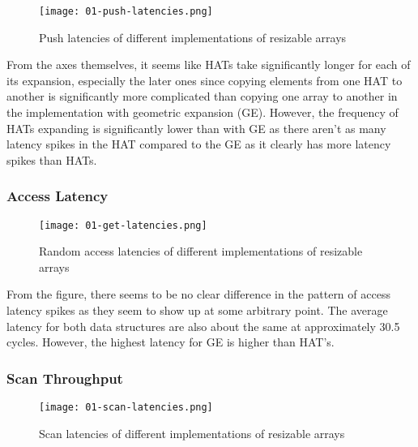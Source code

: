 \begin{figure}[H]
	\begin{center}
		\texttt{[image: 01-push-latencies.png]}
		\caption{Push latencies of different implementations of resizable arrays}
		\label{fig:push-latency}
	\end{center}
\end{figure}

From the axes themselves, it seems like HATs take significantly longer for each of its expansion, especially the later ones since copying elements from one HAT to another is significantly more complicated than copying one array to another in the implementation with geometric expansion (GE). However, the frequency of HATs expanding is significantly lower than with GE as there aren't as many latency spikes in the HAT compared to the GE as it clearly has more latency spikes than HATs.

\endgroup

\begingroup

\subsubsection{Access Latency}

\begin{figure}[H]
	\begin{center}
		\texttt{[image: 01-get-latencies.png]}
		\caption{Random access latencies of different implementations of resizable arrays}
		\label{fig:get-latency}
	\end{center}
\end{figure}

From the figure, there seems to be no clear difference in the pattern of access latency spikes as they seem to show up at some arbitrary point. The average latency for both data structures are also about the same at approximately 30.5 cycles. However, the highest latency for GE is higher than HAT's.

\endgroup

\begingroup

\subsubsection{Scan Throughput}

\begin{figure}[H]
	\begin{center}
		\texttt{[image: 01-scan-latencies.png]}
		\caption{Scan latencies of different implementations of resizable arrays}
		\label{fig:scan-throughput}
	\end{center}
\end{figure}

